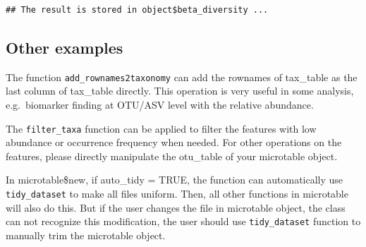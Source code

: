 \documentclass[
]{book}
\newenvironment{Shaded}{\begin{snugshade}}{\end{snugshade}}
\newcommand{\AttributeTok}[1]{\textcolor[rgb]{0.77,0.63,0.00}{#1}}
\newcommand{\CommentTok}[1]{\textcolor[rgb]{0.56,0.35,0.01}{\textit{#1}}}
\newcommand{\FloatTok}[1]{\textcolor[rgb]{0.00,0.00,0.81}{#1}}
\newcommand{\FunctionTok}[1]{\textcolor[rgb]{0.00,0.00,0.00}{#1}}
\newcommand{\NormalTok}[1]{#1}
\newcommand{\OtherTok}[1]{\textcolor[rgb]{0.56,0.35,0.01}{#1}}
\newcommand{\SpecialCharTok}[1]{\textcolor[rgb]{0.00,0.00,0.00}{#1}}
\newcommand{\StringTok}[1]{\textcolor[rgb]{0.31,0.60,0.02}{#1}}
\begin{document}
\begin{verbatim}
## The result is stored in object$beta_diversity ...
\end{verbatim}

\hypertarget{other-examples}{%
\subsection{Other examples}\label{other-examples}}

The function \texttt{add\_rownames2taxonomy} can add the rownames of tax\_table as the last column of tax\_table directly.
This operation is very useful in some analysis, e.g.~biomarker finding at OTU/ASV level with the relative abundance.

\begin{Shaded}
\end{Shaded}

The \texttt{filter\_taxa} function can be applied to filter the features with low abundance or occurrence frequency when needed.
For other operations on the features, please directly manipulate the otu\_table of your microtable object.

\begin{Shaded}
\end{Shaded}

In microtable\$new, if auto\_tidy = TRUE, the function can automatically use \texttt{tidy\_dataset} to make all files uniform.
Then, all other functions in microtable will also do this. But if the user changes the file in microtable object,
the class can not recognize this modification, the user should use \texttt{tidy\_dataset} function to manually trim the microtable object.
\end{document}
